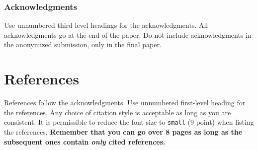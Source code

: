 \documentclass{article}
\begin{document}
\subsubsection*{Acknowledgments}

Use unnumbered third level headings for the acknowledgments. All
acknowledgments go at the end of the paper. Do not include
acknowledgments in the anonymized submission, only in the final paper.

\section*{References}

References follow the acknowledgments. Use unnumbered first-level
heading for the references. Any choice of citation style is acceptable
as long as you are consistent. It is permissible to reduce the font
size to \verb+small+ (9 point) when listing the references. {\bf
  Remember that you can go over 8 pages as long as the subsequent ones contain
  \emph{only} cited references.}
\medskip

\small

\printbibliography
\end{document}

